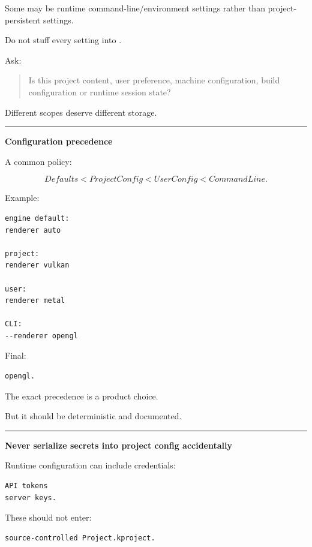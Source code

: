 Some may be runtime command-line/environment settings rather than project-persistent settings.

Do not stuff every setting into .

Ask:

\begin{quote}
Is this project content, user preference, machine configuration, build configuration or runtime session state?
\end{quote}

Different scopes deserve different storage.

\begin{center}\rule{0.5\linewidth}{0.5pt}\end{center}

\textbf{Configuration precedence}

A common policy:

\[
Defaults
<
ProjectConfig
<
UserConfig
<
CommandLine.
\]

Example:

\begin{verbatim}
engine default:
renderer auto

project:
renderer vulkan

user:
renderer metal

CLI:
--renderer opengl
\end{verbatim}

Final:

\begin{verbatim}
opengl.
\end{verbatim}

The exact precedence is a product choice.

But it should be deterministic and documented.

\begin{center}\rule{0.5\linewidth}{0.5pt}\end{center}

\textbf{Never serialize secrets into project config accidentally}

Runtime configuration can include credentials:

\begin{verbatim}
API tokens
server keys.
\end{verbatim}

These should not enter:

\begin{verbatim}
source-controlled Project.kproject.
\end{verbatim}

